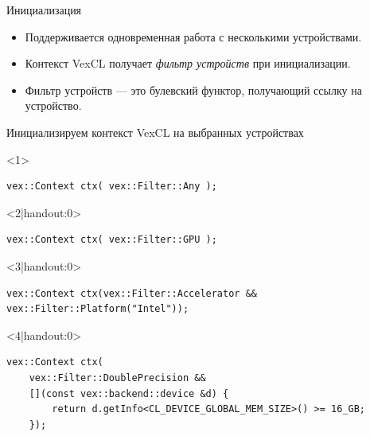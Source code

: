 \documentclass[@BEAMER_OPTIONS@]{beamer}
\begin{document}
\begin{frame}[fragile]{Инициализация}
    \begin{itemize}
        \item Поддерживается одновременная работа с несколькими устройствами.
        \item Контекст VexCL получает \emph{фильтр устройств} при
            инициализации.
        \item Фильтр устройств --- это булевский функтор, получающий ссылку на
            устройство.
    \end{itemize}
    \vspace{-0.5\baselineskip}
    \begin{overlayarea}{\textwidth}{0.4\textheight}
    \begin{exampleblock}{Инициализируем контекст VexCL на выбранных устройствах}
        \begin{onlyenv}<1>
        \begin{lstlisting}
vex::Context ctx( vex::Filter::Any );
        \end{lstlisting}
        \end{onlyenv}
        \begin{onlyenv}<2|handout:0>
        \begin{lstlisting}
vex::Context ctx( vex::Filter::GPU );
        \end{lstlisting}
        \end{onlyenv}
        \begin{onlyenv}<3|handout:0>
        \begin{lstlisting}
vex::Context ctx(vex::Filter::Accelerator && vex::Filter::Platform("Intel"));
        \end{lstlisting}
        \end{onlyenv}
        \begin{onlyenv}<4|handout:0>
        \begin{lstlisting}
vex::Context ctx(
    vex::Filter::DoublePrecision &&
    [](const vex::backend::device &d) {
        return d.getInfo<CL_DEVICE_GLOBAL_MEM_SIZE>() >= 16_GB;
    });
        \end{lstlisting}
        \end{onlyenv}
    \end{exampleblock}
    \end{overlayarea}
    \begin{figure}
\end{figure}
\end{frame}
\end{document}
